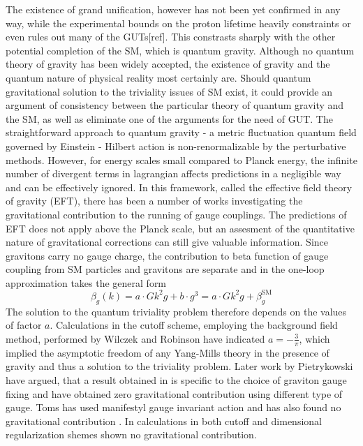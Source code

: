 \documentclass[11pt, a4paper]{article}
\begin{document}
The existence of grand unification, however has not been yet confirmed in any way, while the experimental bounds on the proton lifetime
heavily constraints or even rules out many of the GUTs[ref]. This constrasts sharply with the other potential completion of the SM,
which is quantum gravity. Although no quantum theory of gravity has been widely accepted, the existence of gravity and
the quantum nature of physical reality most certainly are. Should quantum gravitational solution to the triviality issues of SM exist,
it could provide an argument of consistency between the particular theory of quantum gravity and the SM, as well as eliminate one of the arguments for the need of GUT.
The straightforward approach to quantum gravity - a metric fluctuation quantum field governed by Einstein - Hilbert action
is non-renormalizable by the perturbative methods. However, for energy scales small
compared to Planck energy, the infinite number of divergent terms in lagrangian affects predictions in a negligible way and can be effectively ignored.
In this framework, called the effective field theory of gravity (EFT), there has been a number of works investigating
the gravitational contribution to the running of gauge couplings. The predictions of EFT does not apply above
the Planck scale, but an assesment of the quantitative nature of gravitational corrections can still give valuable information.
Since gravitons carry no gauge charge, the contribution to beta function of gauge coupling from SM particles and gravitons are separate
and in the one-loop approximation takes the general form
\begin{equation}
    \beta_g(k) = a \cdot G k^2 g + b \cdot g^3 = a \cdot G k^2 g + \beta_{g}^{\text{SM}}
    \label{betawilczek}
\end{equation}
The solution to the quantum triviality problem therefore depends on the values of factor $a$.
Calculations in the cutoff scheme, employing the background field method, performed by Wilczek and Robinson \cite{wilczek} have indicated
$a = - \frac{3}{\pi} $, which implied the asymptotic freedom of any Yang-Mills theory in the presence of gravity and thus a solution to the triviality problem.
Later work by Pietrykowski \cite{pietrykowski} have argued, that a result obtained in \cite{wilczek} is specific to the choice of graviton gauge fixing and have obtained zero gravitational contribution
using different type of gauge. Toms has used manifestyl gauge invariant action and has also found no gravitational contribution \cite{toms}. In \cite{absence} calculations in both cutoff and dimensional regularization shemes shown no gravitational contribution.
\end{document}
